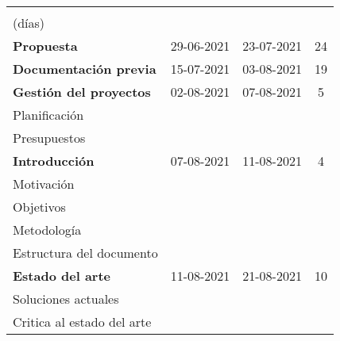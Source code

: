 \begin{longtable}[c]{lcc|c|}
	{\color[HTML]{000000} \textbf{\begin{tabular}[c]{@{}c@{}}Duración\\ (días)\end{tabular}}} \\ \hline
	\endhead
	\multicolumn{1}{|l|}{\textbf{Propuesta}}             & \multicolumn{1}{c|}{29-06-2021} & 23-07-2021                          & 24  \\ \hline
	\multicolumn{1}{|l|}{\textbf{Documentación previa}}  & \multicolumn{1}{c|}{15-07-2021} & 03-08-2021                          & 19  \\ \hline
	\multicolumn{1}{|l|}{\textbf{Gestión del proyectos}} & \multicolumn{1}{c|}{02-08-2021} & 07-08-2021                          & 5   \\ \hline
	\multicolumn{1}{|l|}{Planificación}                  & \multicolumn{1}{c|}{}           &                                     &     \\ \hline
	\multicolumn{1}{|l|}{Presupuestos}                   & \multicolumn{1}{c|}{}           &                                     &     \\ \hline
	\multicolumn{1}{|l|}{\textbf{Introducción}}          & \multicolumn{1}{c|}{07-08-2021} & 11-08-2021                          & 4   \\ \hline
	\multicolumn{1}{|l|}{Motivación}                     & \multicolumn{1}{c|}{}           &                                     &     \\ \hline
	\multicolumn{1}{|l|}{Objetivos}                      & \multicolumn{1}{c|}{}           &                                     &     \\ \hline
	\multicolumn{1}{|l|}{Metodología}                    & \multicolumn{1}{c|}{}           &                                     &     \\ \hline
	\multicolumn{1}{|l|}{Estructura del documento}       & \multicolumn{1}{c|}{}           &                                     &     \\ \hline
	\multicolumn{1}{|l|}{\textbf{Estado del arte}}       & \multicolumn{1}{c|}{11-08-2021} & 21-08-2021                          & 10  \\ \hline
	\multicolumn{1}{|l|}{Soluciones actuales}            & \multicolumn{1}{c|}{}           &                                     &     \\ \hline
	\multicolumn{1}{|l|}{Critica al estado del arte}     & \multicolumn{1}{c|}{}           &                                     &     \\ \hline

\end{longtable}
